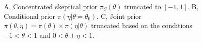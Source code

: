 \documentclass[12pt]{article}
\begin{document}
\begin{figure}[htbp]
\begin{center}
\caption{A, Concentrated skeptical prior $\pi_S(\theta)$ truncated to $[-1,1]$. B, Conditional prior $\pi(\eta|\theta=\theta_0)$. C, Joint prior $\pi(\theta,\eta)=\pi(\theta)\times\pi(\eta|\theta)$ truncated based on the conditions $-1<\theta<1$ and $0<\theta+\eta<1$.}
\label{fig:figure5}
 \end{center}
\end{figure}
%


%
%
\end{document}
